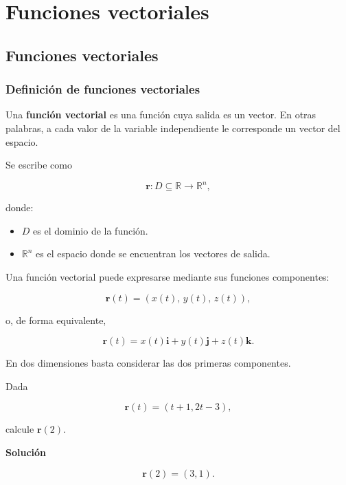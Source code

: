 \chapter{Funciones vectoriales}

\newpage
\section{Funciones vectoriales}

\subsection{Definición de funciones vectoriales}

\begin{definicion}
    Una \textbf{función vectorial} es una función cuya salida es un vector. En otras palabras, a cada valor de la variable independiente le corresponde un vector del espacio.
\end{definicion}

Se escribe como

\[
\mathbf{r}:D\subseteq\mathbb{R}\longrightarrow\mathbb{R}^{n},
\]

donde:

\begin{itemize}
    \item $D$ es el dominio de la función.
    \item $\mathbb{R}^{n}$ es el espacio donde se encuentran los vectores de salida.
\end{itemize}

Una función vectorial puede expresarse mediante sus funciones componentes:

\[
\mathbf{r}(t)=\left(x(t),\,y(t),\,z(t)\right),
\]

o, de forma equivalente,

\[
\mathbf{r}(t)=x(t)\mathbf{i}+y(t)\mathbf{j}+z(t)\mathbf{k}.
\]

En dos dimensiones basta considerar las dos primeras componentes.


\begin{ejercicio}
Dada

\[
\mathbf{r}(t)=\left(t+1,2t-3\right),
\]

calcule $\mathbf{r}(2)$.

\textbf{Solución}

\[
\mathbf{r}(2)
=
(3,1).
\]
\end{ejercicio}

